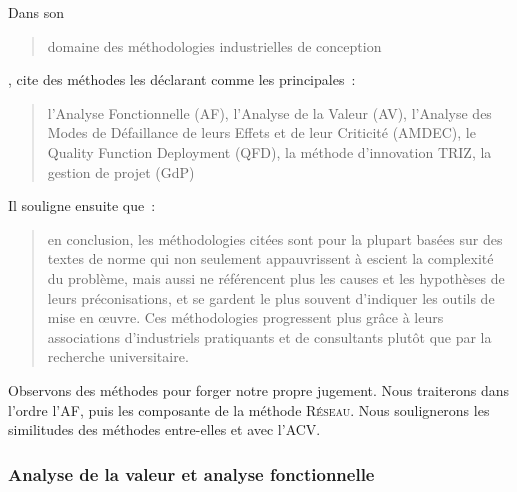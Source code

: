 Dans son \blockcquote[2.3.5]{yannou_preconception_2001}{domaine des méthodologies industrielles de conception},
\citeauthor{yannou_preconception_2001} cite des méthodes les déclarant comme les principales~: \blockcquote[2.3.5]{yannou_preconception_2001}{l’Analyse Fonctionnelle
(AF), l’Analyse de la Valeur (AV), l’Analyse des Modes de Défaillance de leurs Effets et de leur Criticité (AMDEC), le Quality Function Deployment (QFD), la méthode d’innovation TRIZ, la gestion de projet (GdP)}.
Il souligne ensuite que~:
\blockcquote[2.3.5]{yannou_preconception_2001}{en conclusion, les méthodologies citées sont pour la plupart basées sur des textes de norme qui non seulement appauvrissent à escient la complexité du problème, mais aussi ne référencent plus les causes et les hypothèses de leurs préconisations, et se gardent le plus souvent d’indiquer les outils de mise en œuvre. Ces méthodologies progressent plus grâce à leurs associations d’industriels pratiquants et de consultants plutôt que par la recherche universitaire.
}
Observons des méthodes pour forger notre propre jugement.
Nous traiterons dans l'ordre l'\gls{AF}, puis les composante de la méthode \textsc{Réseau}.
Nous soulignerons les similitudes des méthodes entre-elles et avec l'\gls{ACV}.

\subsubsection{Analyse de la valeur et analyse fonctionnelle}

